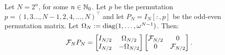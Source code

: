 \begin{theorem}
Let $N=2^n$, for some $n\in\mathbb{N}_0$. Let $p$ be the permutation $p = (1,3\ldots,N-1,2,4,\ldots,N)^\top$ and let $P_N = I_N[:,p]$ be the odd-even permutation matrix. Let $\Omega_N := \operatorname{diag}(1,\ldots,\omega^{N-1})$. Then:
\begin{equation}\label{eq:Radix2Factorization}
\mathcal{F}_NP_N = \begin{bmatrix}
I_{N/2} & \Omega_{N/2}\\
I_{N/2} & -\Omega_{N/2}\\
\end{bmatrix}
\begin{bmatrix}
\mathcal{F}_{N/2} & 0\\
0 & \mathcal{F}_{N/2}\\
\end{bmatrix}.
\end{equation}
\end{theorem}
